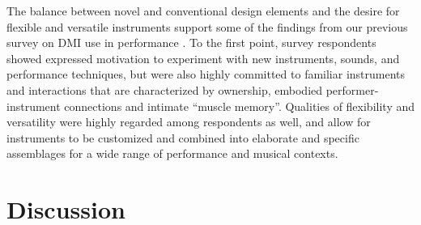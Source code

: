 \documentclass[letterpaper, 12pt]{article}
\begin{document}
The balance between novel and conventional design elements and the desire for flexible and versatile instruments support some of the findings from our previous survey on DMI use in performance \citep{Sullivan2021jnmr}. To the first point, survey respondents showed expressed motivation to experiment with new instruments, sounds, and performance techniques, but were also highly committed to familiar instruments and interactions that are characterized by ownership, embodied performer-instrument connections and intimate ``muscle memory''. Qualities of flexibility and versatility were highly regarded among respondents as well, and allow for instruments to be customized and combined into elaborate and specific assemblages for a wide range of performance and musical contexts. 




\section{Discussion}
\label{sec:discussion}
\end{document}

